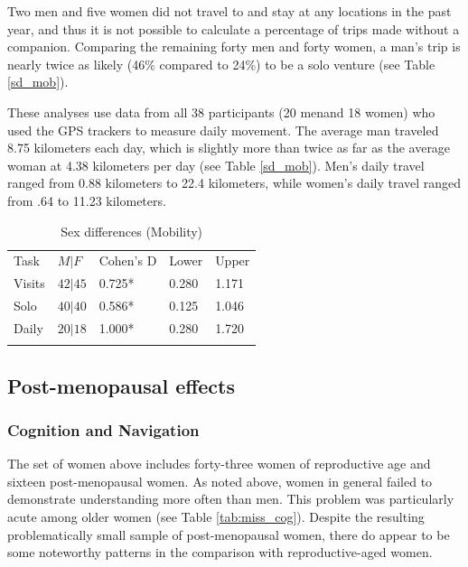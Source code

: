 Two men and five women did not travel to and stay at any locations in the past year, and thus it is not possible to calculate a percentage of trips made without a companion.  Comparing the remaining forty men and forty women, a man's trip is nearly twice as likely (46\% compared to 24\%) to be a solo venture (see Table \ref{sd_mob}).

These analyses use data from all 38 participants (20 menand 18 women) who used the GPS trackers to measure daily movement.  The average man traveled 8.75 kilometers each day, which is slightly more than twice as far as the average woman at 4.38 kilometers per day (see Table \ref{sd_mob}).  Men's daily travel ranged from 0.88 kilometers to 22.4 kilometers, while women's daily travel ranged from .64 to 11.23 kilometers.  

\begin{table}[h!]
\caption{Sex differences (Mobility)}
\label{tab:sd_mob}  
\begin{tabular}{lllll}
\hline\noalign{\smallskip}
Task & $M|F$ & Cohen's D & Lower & Upper  \\
\noalign{\smallskip}\hline\noalign{\smallskip}
Visits & $42|45$ & 0.725* & 0.280 & 1.171 \\
Solo & $40|40$ & 0.586* & 0.125 & 1.046 \\
Daily & $20|18$ & 1.000* & 0.280 & 1.720 \\
\noalign{\smallskip}\hline
\end{tabular}
\end{table}

	\subsection{Post-menopausal effects}
	\label{sec:3.2}
		\subsubsection{Cognition and Navigation}
		\label{sec:3.2.1}
The set of women above includes forty-three women of reproductive age and sixteen post-menopausal women.  As noted above, women in general failed to demonstrate understanding more often than men.  This problem was particularly acute among older women (see Table \ref{tab:miss_cog}).  Despite the resulting problematically small sample of post-menopausal women, there do appear to be some noteworthy patterns in the comparison with reproductive-aged women.

